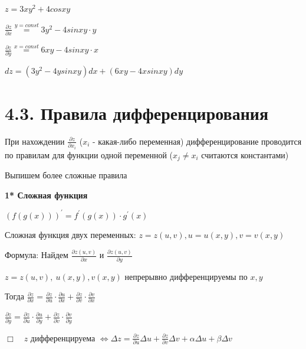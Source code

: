 \documentclass[12pt]{article}
\begin{document}
    \Ex $\displaystyle z = 3xy^2 + 4cosxy$

    $\displaystyle \frac{\partial z}{\partial x} \stackrel{y = const}{=} 3y^2 - 4sinxy \cdot y$

    $\displaystyle \frac{\partial z}{\partial y} \stackrel{x = const}{=} 6xy - 4sinxy \cdot x$

    $\displaystyle dz = (3y^2 - 4ysinxy)dx + (6xy - 4xsinxy)dy$
    
    \vspace{8mm}

    \section{4.3. Правила дифференцирования}

    \Nota При нахождении $\displaystyle \frac{\partial z}{\partial x_i}$ ($x_i$ - какая-либо переменная) дифференцирование проводится по правилам для функции одной переменной ($x_j \neq x_i$ считаются константами)

    Выпишем более сложные правила
    
    \vspace{3mm}

    \hypertarget{derivativeofcomplexfunctionoftwovariables}{}

    \textbf{1* Сложная функция}

    \Mem $\displaystyle (f(g(x)))^\prime = f^\prime(g(x)) \cdot g^\prime(x)$

    \Def Сложная функция двух переменных: $\displaystyle z = z(u, v), u = u(x, y), v = v(x, y)$

    Формула: Найдем $\displaystyle \frac{\partial z(u, v)}{\partial x}$ и $\displaystyle \frac{\partial z(u, v)}{\partial y}$

    \Th $\displaystyle z = z(u, v), \ u(x, y), v(x, y)$ непрерывно дифференцируемы по $\displaystyle x, y$

    Тогда $\displaystyle \frac{\partial z}{\partial x} = \frac{\partial z}{\partial u} \cdot \frac{\partial u}{\partial x} + \frac{\partial z}{\partial v} \cdot \frac{\partial v}{\partial x}$

    $\displaystyle \frac{\partial z}{\partial y} = \frac{\partial z}{\partial u} \cdot \frac{\partial u}{\partial y} + \frac{\partial z}{\partial v} \cdot \frac{\partial v}{\partial y}$

    $\displaystyle \Box \quad z$ дифференцируема $\displaystyle \Longleftrightarrow \Delta z = \frac{\partial z}{\partial u} \Delta u + \frac{\partial z}{\partial v} \Delta v + \alpha \Delta u + \beta \Delta v$
\end{document}
